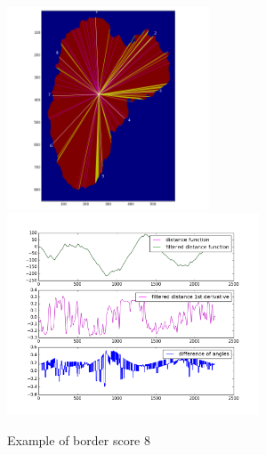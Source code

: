 \begin{figure}[H]
    \includegraphics[height=6cm,keepaspectratio]{assets/border/examples/border_8/border.png}
    \includegraphics[height=6cm,keepaspectratio]{assets/border/examples/border_8/figure_1.png}
    \caption{Example of border score 8}
    \label{fig:border_8}
\end{figure}



